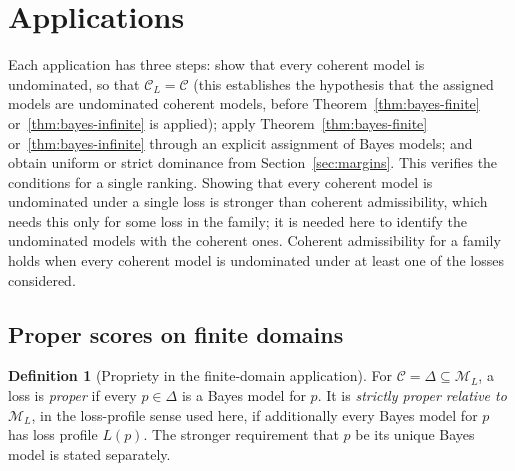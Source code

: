 \documentclass[11pt]{article}
\theoremstyle{definition}
\newtheorem{definition}[theorem]{Definition}
\theoremstyle{remark}
\newcommand{\M}{\mathcal M}
\newcommand{\C}{\mathcal C}
\begin{document}
\section{Applications}\label{sec:apps}
Each application has three steps: show that every coherent model is undominated, so that $\C_L=\C$ (this establishes the hypothesis that the assigned models are undominated coherent models, before Theorem~\ref{thm:bayes-finite} or~\ref{thm:bayes-infinite} is applied); apply Theorem~\ref{thm:bayes-finite} or~\ref{thm:bayes-infinite} through an explicit assignment of Bayes models; and obtain uniform or strict dominance from Section~\ref{sec:margins}. This verifies the conditions for a single ranking. Showing that every coherent model is undominated under a single loss is stronger than coherent admissibility, which needs this only for some loss in the family; it is needed here to identify the undominated models with the coherent ones. Coherent admissibility for a family holds when every coherent model is undominated under at least one of the losses considered.

\subsection{Proper scores on finite domains}\label{sec:proper}
\begin{definition}[Propriety in the finite-domain application]\label{def:propriety}
For $\C=\Delta\subseteq\M_L$, a loss is \emph{proper} if every $p\in\Delta$ is a
Bayes model for $p$. It is \emph{strictly proper relative to $\M_L$}, in the
loss-profile sense used here, if additionally every Bayes model for $p$ has loss profile
$L(p)$. The stronger requirement that $p$ be its unique Bayes model is stated separately.
\end{definition}
\end{document}
